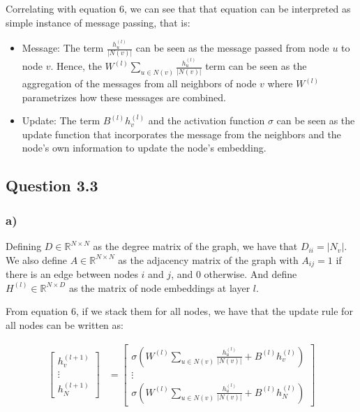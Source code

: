 \documentclass{article}
\begin{document}
Correlating with equation 6, we can see that that equation can be interpreted as simple instance of message passing, that is:

\begin{itemize}
    \item Message: The term $\frac{h_u^{(l)}}{|N(v)|}$ can be seen as the message passed from node $u$ to node $v$. Hence,
the $W^{(l)} \sum_{u \in N(v)} \frac{h_u^{(l)}}{|N(v)|}$ term can be seen as the aggregation of the messages from all neighbors of node $v$
where $W^{(l)}$ parametrizes how these messages are combined.
    \item Update: The term $B^{(l)}h_v^{(l)}$ and the activation function $\sigma$ can be seen as the update function that
incorporates the message from the neighbors and the node's own information to update the node's embedding.
\end{itemize}

\subsection*{Question 3.3}

\subsubsection*{a)}

Defining $D \in \mathbb{R}^{N \times N}$ as the degree matrix of the graph, we have that $D_{ii} = |N_v|$. We also define
$A \in \mathbb{R}^{N \times N}$ as the adjacency matrix of the graph with $A_{ij} = 1$ if there is an edge between nodes $i$ and $j$,
and $0$ otherwise. And define $H^{(l)} \in \mathbb{R}^{N \times D}$ as the matrix of node embeddings at layer $l$.

From equation 6, if we stack them for all nodes, we have that the update rule for all nodes can be written as:

\begin{align*}
    \begin{bmatrix}
        h_v^{(l+1)} \\
        \vdots \\
        h_N^{(l+1)}
    \end{bmatrix}
    & =  \begin{bmatrix}
        \sigma \left(W^{(l)} \sum_{u \in N(v)} \frac{h_u^{(l)}}{|N(v)|} + B^{(l)}h_v^{(l)}\right) \\
        \vdots \\
        \sigma \left(W^{(l)} \sum_{u \in N(v)} \frac{h_u^{(l)}}{|N(v)|} + B^{(l)}h_N^{(l)}\right)
    \end{bmatrix}  \\
\end{align*}
\end{document}
